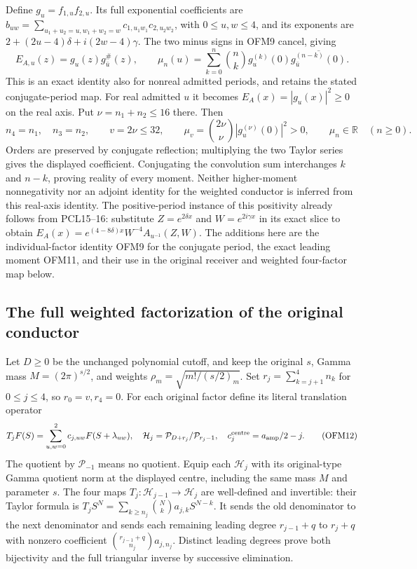 Define $g_u=f_{1,u}f_{2,u}$. Its full exponential coefficients are
$b_{uw}=\sum_{u_1+u_2=u,w_1+w_2=w}c_{1,u_1w_1}c_{2,u_2w_2}$,
with $0\le u,w\le4$, and its exponents are
$2+(2u-4)\delta+i(2w-4)\gamma$. The two minus signs in OFM9
cancel, giving
\[
 E_{A,u}(z)=g_u(z)g_{\bar u}^{\#}(z),\qquad
 \mu_n(u)=\sum_{k=0}^n\binom nk
          g_u^{(k)}(0)\overline{g_{\bar u}^{(n-k)}(0)}.
 \tag{OFM10}
\]
This is an exact identity also for nonreal admitted periods, and
retains the stated conjugate-period map. For real admitted $u$ it
becomes $E_A(x)=|g_u(x)|^2\ge0$ on the real axis. Put
$\nu=n_1+n_2\le16$ there. Then
\[
 n_4=n_1,\quad n_3=n_2,\qquad
 v=2\nu\le32,\qquad
 \boxed{\mu_v=\binom{2\nu}{\nu}|g_u^{(\nu)}(0)|^2>0},
 \qquad \mu_n\in\mathbb R\quad(n\ge0).
 \tag{OFM11}
\]
Orders are preserved by conjugate reflection; multiplying the two
Taylor series gives the displayed coefficient. Conjugating the
convolution sum interchanges $k$ and $n-k$, proving reality of every
moment. Neither higher-moment nonnegativity nor an adjoint identity
for the weighted conductor is inferred from this real-axis identity.
The positive-period instance of this positivity already follows from
PCL15--16: substitute $Z=e^{2\delta x}$ and $W=e^{2i\gamma x}$
in its exact slice to obtain
$E_A(x)=e^{(4-8\delta)x}W^{-4}A_{u^{-1}}(Z,W)$.
The additions here are the individual-factor identity OFM9 for the
conjugate period, the exact leading moment OFM11, and their use in
the original receiver and weighted four-factor map below.

\subsection{The full weighted factorization of the original conductor}
Let $D\ge0$ be the unchanged polynomial cutoff, and keep the original
$s$, Gamma mass $M=(2\pi)^{s/2}$, and weights
$\rho_m=\sqrt{m!/(s/2)_m}$. Set
$r_j=\sum_{k=j+1}^4n_k$ for $0\le j\le4$, so $r_0=v,r_4=0$.
For each original factor define its literal translation operator
\[
 T_jF(S)=\sum_{u,w=0}^2 c_{j,uw}F(S+\lambda_{uw}),\quad
 \mathcal H_j=\mathcal P_{D+r_j}/\mathcal P_{r_j-1},\quad
 c_j^{\rm centre}=a_{\rm amp}/2-j.
 \tag{OFM12}
\]
The quotient by $\mathcal P_{-1}$ means no quotient. Equip each
$\mathcal H_j$ with its original-type Gamma quotient norm at the
displayed centre, including the same mass $M$ and parameter $s$.
The four maps $T_j:\mathcal H_{j-1}\to\mathcal H_j$ are well-defined
and invertible: their Taylor formula is
$T_j S^N=\sum_{k\ge n_j}\binom Nk a_{j,k}S^{N-k}$.
It sends the old denominator to the next denominator and sends each
remaining leading degree $r_{j-1}+q$ to $r_j+q$ with nonzero
coefficient $\binom{r_{j-1}+q}{n_j}a_{j,n_j}$.
Distinct leading degrees prove both bijectivity and the full
triangular inverse by successive elimination.

